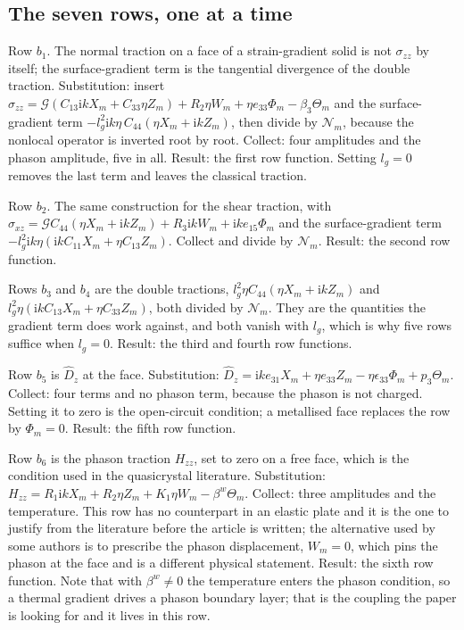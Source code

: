 \documentclass[11pt]{article}
\makeatletter
\newif\ifshowworked
\newenvironment{worked}{%
  \ifshowworked\par\smallskip\noindent\textit{Working.}\par\smallskip\else
  \setbox\z@\vbox\bgroup\fi}{\ifshowworked\par\smallskip\else\egroup\fi}
\newcommand{\ii}{\mathrm{i}}
\newcommand{\Ncal}{\mathcal{N}}
\newcommand{\Gcal}{\mathcal{G}}
\makeatother
\begin{document}
\subsection*{The seven rows, one at a time}

\begin{worked}
Row $b_1$. The normal traction on a face of a strain-gradient solid is not $\sigma_{zz}$ by itself; the
surface-gradient term is the tangential divergence of the double traction. Substitution: insert
$\hat\sigma_{zz}=\Gcal(C_{13}\ii kX_m+C_{33}\eta Z_m)+R_2\eta W_m+\eta e_{33}\Phi_m-\beta_3\Theta_m$ and
the surface-gradient term $-l_g^2\ii k\eta\,C_{44}(\eta X_m+\ii kZ_m)$, then divide by $\Ncal_m$, because
the nonlocal operator is inverted root by root. Collect: four amplitudes and the phason amplitude, five
in all. Result: the first row function. Setting $l_g=0$ removes the last term and leaves the classical
traction.
\end{worked}

\begin{worked}
Row $b_2$. The same construction for the shear traction, with
$\hat\sigma_{xz}=\Gcal C_{44}(\eta X_m+\ii kZ_m)+R_3\ii kW_m+\ii ke_{15}\Phi_m$ and the surface-gradient
term $-l_g^2\ii k\eta(\ii kC_{11}X_m+\eta C_{13}Z_m)$. Collect and divide by $\Ncal_m$. Result: the second
row function.
\end{worked}

\begin{worked}
Rows $b_3$ and $b_4$ are the double tractions, $l_g^2\eta C_{44}(\eta X_m+\ii kZ_m)$ and
$l_g^2\eta(\ii kC_{13}X_m+\eta C_{33}Z_m)$, both divided by $\Ncal_m$. They are the quantities the
gradient term does work against, and both vanish with $l_g$, which is why five rows suffice when
$l_g=0$. Result: the third and fourth row functions.
\end{worked}

\begin{worked}
Row $b_5$ is $\hat D_z$ at the face. Substitution:
$\hat D_z=\ii ke_{31}X_m+\eta e_{33}Z_m-\eta\epsilon_{33}\Phi_m+p_3\Theta_m$. Collect: four terms and no
phason term, because the phason is not charged. Setting it to zero is the open-circuit condition; a
metallised face replaces the row by $\Phi_m=0$. Result: the fifth row function.
\end{worked}

\begin{worked}
Row $b_6$ is the phason traction $H_{zz}$, set to zero on a free face, which is the condition used in the
quasicrystal literature. Substitution:
$H_{zz}=R_1\ii kX_m+R_2\eta Z_m+K_1\eta W_m-\beta^{w}\Theta_m$. Collect: three amplitudes and the
temperature. This row has no counterpart in an elastic plate and it is the one to justify from the
literature before the article is written; the alternative used by some authors is to prescribe the phason
displacement, $W_m=0$, which pins the phason at the face and is a different physical statement. Result:
the sixth row function. Note that with $\beta^{w}\ne0$ the temperature enters the phason condition, so a
thermal gradient drives a phason boundary layer; that is the coupling the paper is looking for and it
lives in this row.
\end{worked}
\end{document}
